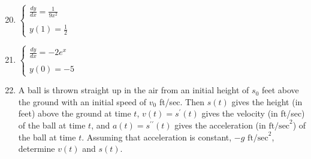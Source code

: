 \documentclass[12pt]{article}
\newif\ifans
\begin{document}
\newpage


\begin{enumerate}
\setcounter{enumi}{19}

\item $\left\{\begin{array}{l}
\frac{dy}{dx}=\frac{1}{9x^2}\\
\\
y(1)=\frac{1}{2}
\end{array}\right.$

\ifans{\fbox{$y=-\frac{1}{9}x^{-1}+\frac{11}{18}$}} \fi

\item $\left\{\begin{array}{l}
\frac{dy}{dx}=-2e^{x}\\
\\
y(0)=-5
\end{array}\right.$

\ifans{\fbox{$y=-2e^{x}-3$; Video Solution: \textcolor{blue}{\href{https://www.youtube.com/watch?v=kvFRPT4nTIM}{https://www.youtube.com/watch?v=kvFRPT4nTIM}}}} \fi

\item A ball is thrown straight up in the air from an initial height of $s_0$ feet above the ground with an initial speed of $v_0$ ft/sec.  Then $s(t)$ gives the height (in feet) above the ground at time $t$, $v(t)=s^{\prime}(t)$ gives the velocity (in ft/sec) of the ball at time $t$, and $a(t)=s^{\prime \prime}(t)$ gives the acceleration (in $\text{ft/sec}^2$) of the ball at time $t$.  Assuming that acceleration is constant, $-g \text{ ft/sec}^2$, determine $v(t)$ and $s(t)$.

\ifans{\fbox{$v(t)=-gt+v_0$, $s(t)=-\frac{1}{2}gt^2+v_0t+s_0$}} \fi

\end{enumerate}
\end{document}
